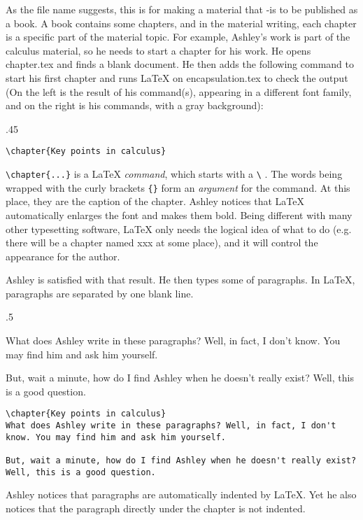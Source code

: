 As the file name suggests, this is for making a material that -is to be published as a book. A book contains some chapters, and in the material writing, each chapter is a specific part of the material topic. For example, Ashley's work is part of the calculus material, so he needs to start a chapter for his work. He opens chapter.tex and finds a blank document. He then adds the following command to start his first chapter and runs \LaTeX{} on encapsulation.tex to check the output (On the left is the result of his command(s), appearing in a different font family, and on the right is his commands, with a gray background):

\begin{miniexammar}{.45\textandmarginlen}{}
\begin{lstlisting}
\chapter{Key points in calculus}
\end{lstlisting}
\end{miniexammar}
\verb=\chapter{...}= is a \LaTeX{} \emph{command}, which starts with a \verb=\=%
. The words being wrapped with the curly brackets \verb={}= form an \emph{argument} for the command. At this place, they are the caption of the chapter. Ashley notices that \LaTeX{} automatically enlarges the font and makes them bold. Being different with many other typesetting software, \LaTeX{} only needs the logical idea of what to do (e.g. there will be a chapter named xxx at some place), and it will control the appearance for the author.

Ashley is satisfied with that result. He then types some of paragraphs. In \LaTeX{}, paragraphs are separated by one blank line.

\begin{miniexammar}{.5\textandmarginlen}{
%
What does Ashley write in these paragraphs? Well, in fact, I don't know. You may find him and ask him yourself.
		
\hspace{1.5em}But, wait a minute, how do I find Ashley when he doesn't really exist? Well, this is a good question.}
\begin{lstlisting}
\chapter{Key points in calculus}
What does Ashley write in these paragraphs? Well, in fact, I don't know. You may find him and ask him yourself.
		
But, wait a minute, how do I find Ashley when he doesn't really exist? Well, this is a good question.
\end{lstlisting}
\end{miniexammar}
Ashley notices that paragraphs are automatically indented by \LaTeX{}. Yet he also notices that the paragraph directly under the chapter is not indented.

